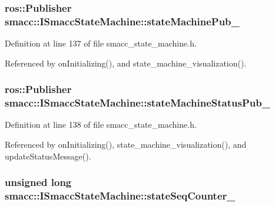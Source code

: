 \subsubsection[{\texorpdfstring{state\+Machine\+Pub\+\_\+}{stateMachinePub_}}]{\setlength{\rightskip}{0pt plus 5cm}ros\+::\+Publisher smacc\+::\+I\+Smacc\+State\+Machine\+::state\+Machine\+Pub\+\_\+\hspace{0.3cm}{\ttfamily [protected]}}\hypertarget{classsmacc_1_1ISmaccStateMachine_af4aa9fed70bd4c57b19e3370fbd25de7}{}\label{classsmacc_1_1ISmaccStateMachine_af4aa9fed70bd4c57b19e3370fbd25de7}


Definition at line 137 of file smacc\+\_\+state\+\_\+machine.\+h.



Referenced by on\+Initializing(), and state\+\_\+machine\+\_\+visualization().

\subsubsection[{\texorpdfstring{state\+Machine\+Status\+Pub\+\_\+}{stateMachineStatusPub_}}]{\setlength{\rightskip}{0pt plus 5cm}ros\+::\+Publisher smacc\+::\+I\+Smacc\+State\+Machine\+::state\+Machine\+Status\+Pub\+\_\+\hspace{0.3cm}{\ttfamily [protected]}}\hypertarget{classsmacc_1_1ISmaccStateMachine_a55a7c7b26ad4dfea441c62c6326a5414}{}\label{classsmacc_1_1ISmaccStateMachine_a55a7c7b26ad4dfea441c62c6326a5414}


Definition at line 138 of file smacc\+\_\+state\+\_\+machine.\+h.



Referenced by on\+Initializing(), state\+\_\+machine\+\_\+visualization(), and update\+Status\+Message().

\subsubsection[{\texorpdfstring{state\+Seq\+Counter\+\_\+}{stateSeqCounter_}}]{\setlength{\rightskip}{0pt plus 5cm}unsigned long smacc\+::\+I\+Smacc\+State\+Machine\+::state\+Seq\+Counter\+\_\+\hspace{0.3cm}{\ttfamily [private]}}\hypertarget{classsmacc_1_1ISmaccStateMachine_ab41ee07d20715142e2f7c92d551b2bd6}{}\label{classsmacc_1_1ISmaccStateMachine_ab41ee07d20715142e2f7c92d551b2bd6}


